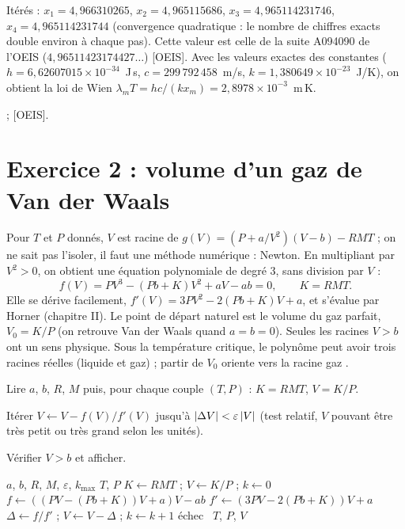 \Verif Itérés : $x_1 = 4{,}966310265$, $x_2 = 4{,}965115686$,
$x_3 = 4{,}965114231746$, $x_4 = 4{,}965114231744$ (convergence quadratique :
le nombre de chiffres exacts double environ à chaque pas). Cette valeur est
celle de la suite A094090 de l'OEIS ($4{,}96511423174427\ldots$) [OEIS]. Avec
les valeurs exactes des constantes ($h = 6{,}62607015\times 10^{-34}$~J\,s,
$c = 299\,792\,458$~m/s, $k = 1{,}380649\times 10^{-23}$~J/K), on obtient la loi
de Wien $\lambda_mT = hc/(kx_m) = 2{,}8978\times 10^{-3}$~m\,K.

\Refs {} ; [OEIS].

\section{Exercice 2 : volume d'un gaz de Van der Waals}

\Pourquoi Pour $T$ et $P$ donnés, $V$ est racine de
$g(V) = (P + a/V^2)(V - b) - RMT$ ; on ne sait pas l'isoler, il faut une
méthode numérique : Newton. En multipliant par $V^2 > 0$, on obtient une
équation polynomiale de degré 3, sans division par $V$ :
\[
  f(V) = PV^3 - (Pb + K)V^2 + aV - ab = 0, \qquad K = RMT .
\]
Elle se dérive facilement, $f'(V) = 3PV^2 - 2(Pb + K)V + a$, et s'évalue par
Horner (chapitre II). Le point de départ naturel est le volume du gaz parfait,
$V_0 = K/P$ (on retrouve Van der Waals quand $a = b = 0$). Seules les racines
$V > b$ ont un sens physique. Sous la température critique, le polynôme peut
avoir trois racines réelles (liquide et gaz) ; partir de $V_0$ oriente vers la
racine \og gaz \fg.

\Etapes
{} Lire $a$, $b$, $R$, $M$ puis, pour chaque couple $(T, P)$ :
$K = RMT$, $V = K/P$.

 Itérer $V \leftarrow V - f(V)/f'(V)$ jusqu'à
$\left|\Delta V\right| < \varepsilon\left|V\right|$ (test relatif, $V$ pouvant être très
petit ou très grand selon les unités).

 Vérifier $V > b$ et afficher.

\begin{algo}
  \Require $a$, $b$, $R$, $M$, $\varepsilon$, $k_{\max}$
    \Read $T$, $P$
    \State $K \leftarrow RMT$ ; $V \leftarrow K/P$ ; $k \leftarrow 0$
    \Repeat
      \State $f \leftarrow ((PV - (Pb + K))V + a)V - ab$ 
      \State $f' \leftarrow (3PV - 2(Pb + K))V + a$
      \State $\Delta \leftarrow f/f'$ ; $V \leftarrow V - \Delta$ ; $k \leftarrow k + 1$
     \Print \og échec \fg{} \Else \ \Print $T$, $P$, $V$ \EndIf
  \EndWhile
\end{algo}

